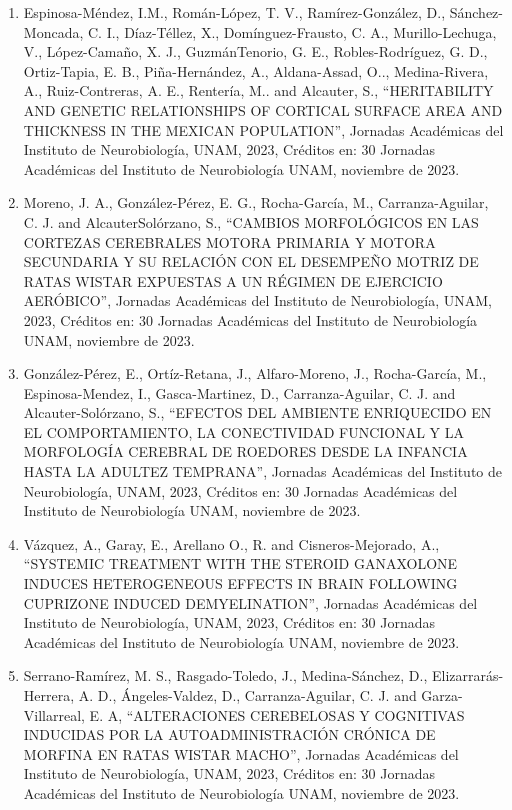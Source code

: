 \begin{enumerate}
\item Espinosa-Méndez, I.M., Román-López, T. V., Ramírez-González, D., Sánchez-Moncada, C. I., Díaz-Téllez, X., Domínguez-Frausto, C. A., 
Murillo-Lechuga, V., López-Camaño, X. J., GuzmánTenorio, G. E., Robles-Rodríguez, G. D., Ortiz-Tapia, E. B., Piña-Hernández, A., 
Aldana-Assad, O.., Medina-Rivera, A., Ruiz-Contreras, A. E., Rentería, M.. and Alcauter, S., “HERITABILITY AND GENETIC RELATIONSHIPS OF 
CORTICAL SURFACE AREA AND THICKNESS IN THE MEXICAN POPULATION”, Jornadas Académicas del Instituto de Neurobiología, UNAM, 2023, Créditos en: 
30 Jornadas Académicas del Instituto de Neurobiología UNAM, noviembre de 2023.

\item Moreno, J. A., González-Pérez, E. G., Rocha-García, M., Carranza-Aguilar, C. J. and AlcauterSolórzano, S., “CAMBIOS MORFOLÓGICOS EN LAS 
CORTEZAS CEREBRALES MOTORA PRIMARIA Y MOTORA SECUNDARIA Y SU RELACIÓN CON EL DESEMPEÑO MOTRIZ DE RATAS WISTAR EXPUESTAS A UN RÉGIMEN DE 
EJERCICIO AERÓBICO”, Jornadas Académicas del Instituto de Neurobiología, UNAM, 2023, Créditos en: 30 Jornadas Académicas del Instituto de 
Neurobiología UNAM, noviembre de 2023.

\item González-Pérez, E., Ortíz-Retana, J., Alfaro-Moreno, J., Rocha-García, M., Espinosa-Mendez, I., Gasca-Martinez, D., Carranza-Aguilar, 
C. J. 
and Alcauter-Solórzano, S., “EFECTOS DEL AMBIENTE ENRIQUECIDO EN EL COMPORTAMIENTO, LA CONECTIVIDAD FUNCIONAL Y LA MORFOLOGÍA CEREBRAL DE 
ROEDORES DESDE LA INFANCIA HASTA LA ADULTEZ TEMPRANA”, Jornadas Académicas del Instituto de Neurobiología, UNAM, 2023, Créditos en: 30 
Jornadas Académicas del Instituto de Neurobiología UNAM, noviembre de 2023.

\item Vázquez, A., Garay, E., Arellano O., R. and Cisneros-Mejorado, A., “SYSTEMIC TREATMENT WITH THE STEROID GANAXOLONE INDUCES 
HETEROGENEOUS 
EFFECTS IN BRAIN FOLLOWING CUPRIZONE INDUCED DEMYELINATION”, Jornadas Académicas del Instituto de Neurobiología, UNAM, 2023, Créditos en: 30 
Jornadas Académicas del Instituto de Neurobiología UNAM, noviembre de 2023.

\item Serrano-Ramírez, M. S., Rasgado-Toledo, J., Medina-Sánchez, D., Elizarrarás-Herrera, A. D., Ángeles-Valdez, D., Carranza-Aguilar, C. J. 
and 
Garza-Villarreal, E. A, “ALTERACIONES CEREBELOSAS Y COGNITIVAS INDUCIDAS POR LA AUTOADMINISTRACIÓN CRÓNICA DE MORFINA EN RATAS WISTAR MACHO”, 
Jornadas Académicas del Instituto de Neurobiología, UNAM, 2023, Créditos en: 30 Jornadas Académicas del Instituto de Neurobiología UNAM, 
noviembre de 2023.


\end{enumerate}
